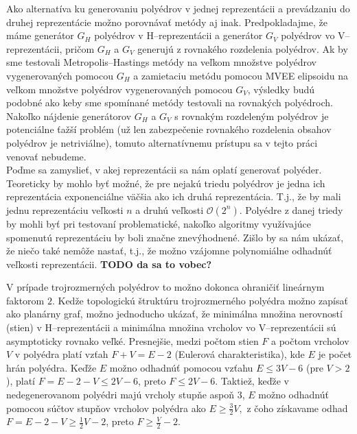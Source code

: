 Ako alternatíva ku generovaniu polyédrov v jednej reprezentácii a prevádzaniu do druhej reprezentácie možno porovnávať metódy aj inak. 
Predpokladajme, že máme generátor $G_H$ polyédrov v H--reprezentácii a generátor $G_V$ polyédrov vo V--reprezentácii, pričom $G_H$ a $G_V$ generujú z rovnakého rozdelenia polyédrov.
Ak by sme testovali Metropolis--Hastings metódy na veľkom množstve polyédrov vygenerovaných pomocou $G_H$ a zamietaciu metódu pomocou MVEE elipsoidu na veľkom množstve polyédrov vygenerovaných pomocou $G_V$, výsledky budú podobné ako keby sme spomínané metódy testovali na rovnakých polyédroch.
Nakoľko nájdenie generátorov $G_H$ a $G_V$ s rovnakým rozdeleným polyédrov je potenciálne ťažší problém (už len zabezpečenie rovnakého rozdelenia obsahov polyédrov je netriviálne), tomuto alternatívnemu prístupu sa v tejto práci venovať nebudeme.\\


Poďme sa zamyslieť, v akej reprezentácii sa nám oplatí generovať polyéder. Teoreticky by mohlo byť možné, že pre nejakú triedu polyédrov je jedna ich reprezentácia exponenciálne väčšia ako ich druhá reprezentácia. T.j., že by mali jednu reprezentáciu veľkosti $n$ a druhú veľkosti $\mathcal O(2^n)$. Polyédre z danej triedy by mohli byť pri testovaní problematické, nakoľko algoritmy využívajúce spomenutú reprezentáciu by boli značne znevýhodnené. Zišlo by sa nám ukázať, že niečo také nemôže nastať, t.j., že možno vzájomne polynomiálne odhadnúť veľkosti reprezentácii. \textbf{TODO da sa to vobec?}

V prípade trojrozmerných polyédrov to možno dokonca ohraničiť lineárnym faktorom $2$. Kedže topologickú štruktúru trojrozmerného polyédra možno zapísať ako planárny graf, možno jednoducho ukázať, že minimálna množina nerovností (stien) v H--reprezentácii a minimálna množina vrcholov vo V--reprezentácii sú asymptoticky rovnako veľké.
Presnejšie, medzi počtom stien $F$ a počtom vrcholov $V$ v polyédra platí vzťah $F+V=E-2$ (Eulerová charakteristika), kde $E$ je počet hrán polyédra. Keďže $E$ možno odhadnúť pomocou vzťahu $E \le 3V-6$ (pre $V>2$), platí $F=E-2-V \leq 2V-6$, preto $F \leq 2V-6$. Taktiež, keďže v nedegenerovanom polyédri majú vrcholy stupňe aspoň $3$, $E$ možno odhadnúť pomocou súčtov stupňov vrcholov polyédra ako $E \geq \frac{3}{2}V,$ z čoho získavame odhad $F=E-2-V \geq \frac 1 2 V-2$, preto $F \geq \frac V 2 -2$.

